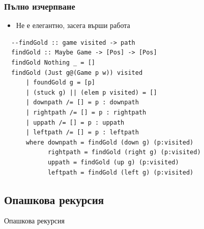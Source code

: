 \documentclass{beamer}
\begin{document}
\begin{frame}[fragile]
  \frametitle{Пълно изчерпване}


     
\begin{itemize}
  \item Не е елегантно, засега върши работа
\end{itemize}

\begin{lstlisting}
  --findGold :: game visited -> path
  findGold :: Maybe Game -> [Pos] -> [Pos]
  findGold Nothing _ = []
  findGold (Just g@(Game p w)) visited
      | foundGold g = [p]
      | (stuck g) || (elem p visited) = []
      | downpath /= [] = p : downpath
      | rightpath /= [] = p : rightpath
      | uppath /= [] = p : uppath
      | leftpath /= [] = p : leftpath
      where downpath = findGold (down g) (p:visited)
            rightpath = findGold (right g) (p:visited)
            uppath = findGold (up g) (p:visited)
            leftpath = findGold (left g) (p:visited)  
\end{lstlisting}
  

\end{frame}

\subsection{Опашкова рекурсия}

\begin{frame}
  \centerline{Опашкова рекурсия}
\end{frame}
\end{document}
